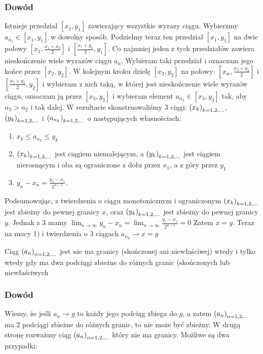 \documentclass[9pt]{article}
\begin{document}
\subsubsection*{Dowód}

Istnieje przedział $[x_1, y_1]$ zawierający wszystkie wyrazy ciągu. Wybierzmy $a_{n_1} \in [x_1,
y_1]$ w dowolny sposób. Podzielmy teraz ten przedział $[x_1, y_1]$ na dwie połowy $\left[x_1,
\frac{x_1+x_2}{2}\right]$ i $\left[\frac{x_1+y_1}{2}, y_1\right]$. Co najmniej jeden z tych
przedziałów zawiera nieskończenie wiele wyrazów ciągu $a_n$. Wybieram taki przedział i oznaczam jego
końce przez $[x_2, y_2]$. W kolejnym kroku dzielę $[x_2, y_2]$ na połowy: $\left[x_w,
\frac{x_2+y_2}{2}\right]$ i $\left[\frac{x_2+y_2}{2}, y_2\right]$ i wybieram z nich taką, w której
jest nieskończenie wiele wyrazów ciągu, oznaczam ją przez $\left[x_3, y_3\right]$ i wybieram element
$a_{n_3} \in \left[x_3, y_3\right]$ tak, aby $n_3 > n_2$ i tak dalej. W rezultacie skonstruowaliśmy
$3$ ciągi: $\left(x_k\right)_{k = 1,2,...}$, $\left(y_k\right)_{k = 1,2,...}$ i $\left(a_{n_k}\right)_{k = 1,2,...}$ o następujących własnościach:
\begin{enumerate}
    \item $x_k \le a_{n_k} \le y_k$
    \item $\left(x_k\right)_{k = 1,2,...}$ jest ciągiem niemalejącym, a $\left(y_k\right)_{k = 1,2,...}$ jest ciągiem nierosnącym i
        oba są ograniczone z dołu przez $x_1$, a z góry przez $y_1$
    \item $y_n - x_n = \frac{y_1-x_1}{2^{n-1}}$.
\end{enumerate}
Podsumowując, z twierdzenia o ciągu monotonicznym i ograniczonym $\left(x_k\right)_{k = 1,2,...}$ jest zbieżny do
pewnej granicy $x$, oraz $\left(y_k\right)_{k = 1,2,...}$ jest zbieżny do pewnej granicy $y$. Jednak z $3$ mamy
$\lim_{n \to \infty} y_n - x_n = \lim_{n \to \infty} \frac{y_1-x_1}{2^{n-1}} = 0$ Zatem $x = y$.
Teraz na mocy 1) i twierdzenia o $3$ ciągach $a_{n_k} \to x=y$

\begin{Twi}
    Ciąg $\left(a_n\right)_{n = 1,2,...}$ jest nie ma granicy (skończonej ani niewłaściwej) wtedy i tylko wtedy gdy ma
    dwa podciągi zbieżne do różnych granic (skończonych lub niewłaściwych
\end{Twi}

\subsubsection*{Dowód}

Wiemy, że jeśli $a_n \to g$ to każdy jego podciąg zbiega do $g$, a zatem $\left(a_n\right)_{n = 1,2,...}$ ma $2$
podciągi zbieżne do różnych granic, to nie może być zbieżny. W drugą stronę rozważmy ciąg
$\left(a_n\right)_{n = 1,2,...}$ który nie ma granicy. Możliwe są dwa przypadki:
\end{document}
